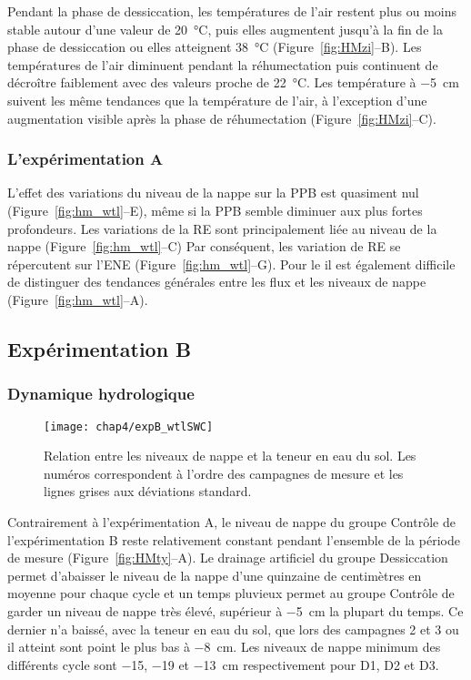 Pendant la phase de dessiccation, les températures de l'air restent plus ou moins stable autour d'une valeur de \SI{20}{\degreeCelsius}, puis elles augmentent jusqu'à la fin de la phase de dessiccation ou elles atteignent \SI{38}{\degreeCelsius} (Figure~\ref{fig:HMzi}--B).
Les températures de l'air diminuent pendant la réhumectation puis continuent de décroître faiblement avec des valeurs proche de \SI{22}{\degreeCelsius}.
Les température à \SI{-5}{\centi\metre} suivent les même tendances que la température de l'air, à l'exception d'une augmentation visible après la phase de réhumectation (Figure~\ref{fig:HMzi}--C).


\subsubsection{L'expérimentation A}

L'effet des variations du niveau de la nappe sur la PPB est quasiment nul (Figure~\ref{fig:hm_wtl}--E), même si la PPB semble diminuer aux plus fortes profondeurs.
Les variations de la RE sont principalement liée au niveau de la nappe (Figure~\ref{fig:hm_wtl}--C) Par conséquent, les variation de RE se répercutent sur l'ENE (Figure~\ref{fig:hm_wtl}--G).
Pour le \chh il est également difficile de distinguer des tendances générales entre les flux et les niveaux de nappe (Figure~\ref{fig:hm_wtl}--A).

\subsection{Expérimentation B}

\subsubsection{Dynamique hydrologique}

\begin{figure}
\centering
\texttt{[image: chap4/expB\_wtlSWC]}
\caption{Relation entre les niveaux de nappe et la teneur en eau du sol. Les numéros correspondent à l'ordre des campagnes de mesure et les lignes grises aux déviations standard.}
\label{fig:wtlSWC_B}
\end{figure}

Contrairement à l'expérimentation A, le niveau de nappe du groupe Contrôle de l'expérimentation B reste relativement constant pendant l'ensemble de la période de mesure (Figure~\ref{fig:HMty}--A).
Le drainage artificiel du groupe Dessiccation permet d'abaisser le niveau de la nappe d'une quinzaine de centimètres en moyenne pour chaque cycle et un temps pluvieux permet au groupe Contrôle de garder un niveau de nappe très élevé, supérieur à \SI{-5}{\centi\metre} la plupart du temps.
Ce dernier n'a baissé, avec la teneur en eau du sol, que lors des campagnes 2 et 3 ou il atteint sont point le plus bas à \SI{-8}{\centi\metre}.
Les niveaux de nappe minimum des différents cycle sont \num{-15}, \num{-19} et \SI{-13}{\centi\metre} respectivement pour D1, D2 et D3.

